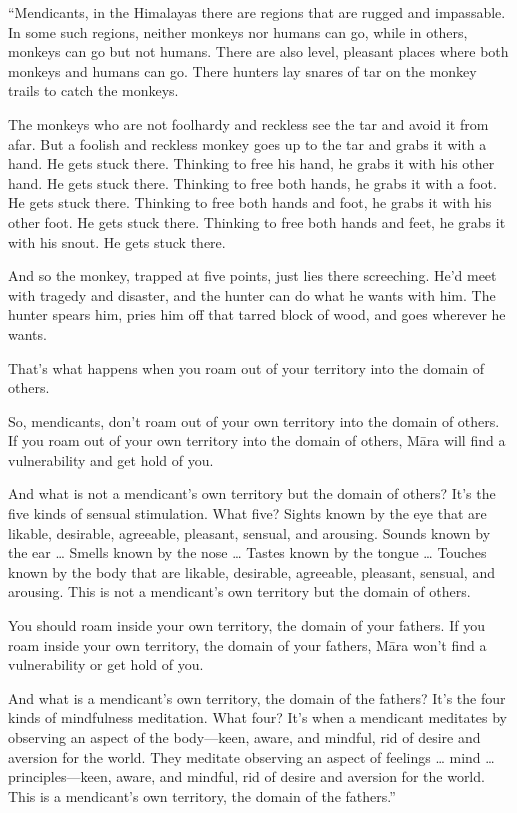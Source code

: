\documentclass[12pt,openany]{book}%
\begin{document}
“Mendicants, in the Himalayas there are regions that are rugged and impassable. In some such regions, neither monkeys nor humans can go, while in others, monkeys can go but not humans. There are also level, pleasant places where both monkeys and humans can go. There hunters lay snares of tar on the monkey trails to catch the monkeys. 

The monkeys who are not foolhardy and reckless see the tar and avoid it from afar. But a foolish and reckless monkey goes up to the tar and grabs it with a hand. He gets stuck there. Thinking to free his hand, he grabs it with his other hand. He gets stuck there. Thinking to free both hands, he grabs it with a foot. He gets stuck there. Thinking to free both hands and foot, he grabs it with his other foot. He gets stuck there. Thinking to free both hands and feet, he grabs it with his snout. He gets stuck there. 

And so the monkey, trapped at five points, just lies there screeching. He’d meet with tragedy and disaster, and the hunter can do what he wants with him. The hunter spears him, pries him off that tarred block of wood, and goes wherever he wants. 

That’s what happens when you roam out of your territory into the domain of others. 

So, mendicants, don’t roam out of your own territory into the domain of others. If you roam out of your own territory into the domain of others, \textsanskrit{Māra} will find a vulnerability and get hold of you. 

And what is not a mendicant’s own territory but the domain of others? It’s the five kinds of sensual stimulation. What five? Sights known by the eye that are likable, desirable, agreeable, pleasant, sensual, and arousing. Sounds known by the ear … Smells known by the nose … Tastes known by the tongue … Touches known by the body that are likable, desirable, agreeable, pleasant, sensual, and arousing. This is not a mendicant’s own territory but the domain of others. 

You should roam inside your own territory, the domain of your fathers. If you roam inside your own territory, the domain of your fathers, \textsanskrit{Māra} won’t find a vulnerability or get hold of you. 

And what is a mendicant’s own territory, the domain of the fathers? It’s the four kinds of mindfulness meditation. What four? It’s when a mendicant meditates by observing an aspect of the body—keen, aware, and mindful, rid of desire and aversion for the world. They meditate observing an aspect of feelings … mind … principles—keen, aware, and mindful, rid of desire and aversion for the world. This is a mendicant’s own territory, the domain of the fathers.” 
\end{document}
